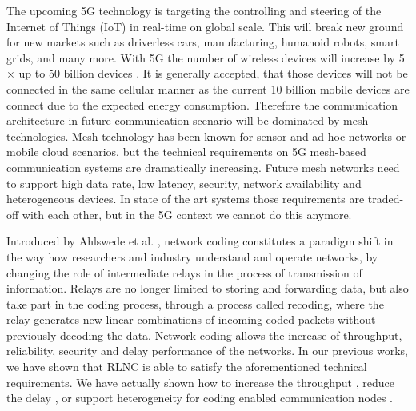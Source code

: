 %

The upcoming 5G technology is targeting the controlling and steering of the Internet of Things (IoT) in real-time on global scale. This will break new ground for new markets such as driverless cars, manufacturing, humanoid robots, smart grids, and many more. With 5G the number of wireless devices will increase by 5$\times$ up to 50 billion devices \cite{cisco2011forecast}. It is generally accepted, that those devices will not be connected in the same cellular manner as the current 10 billion mobile devices are connect due to the expected energy consumption. Therefore the communication architecture in future communication scenario will be dominated by mesh technologies. Mesh technology has been known for sensor and ad hoc networks or mobile cloud scenarios, but the technical requirements on 5G mesh-based communication systems are dramatically increasing. Future mesh networks need to support high data rate, low latency, security, network availability and heterogeneous devices. In state of the art systems those requirements are traded-off with each other, but in the 5G context we cannot do this anymore.

Introduced by Ahlswede et al. \cite{ahlswede2000network}, network coding constitutes a paradigm shift in the way how researchers and industry understand and operate networks, by changing the role of intermediate relays in the process of transmission of information. Relays are no longer limited to storing and forwarding data, but also take part in the coding process, through a process called recoding, where the relay generates new linear combinations of incoming coded packets without previously decoding the data. Network coding allows the increase of throughput, reliability, security and delay performance of the networks. In our previous works, we have shown that \ac{RLNC} \cite{koetter2003algebraic,ho2006random} is able to satisfy the aforementioned technical requirements. We have actually shown how to increase the throughput \cite{pahlevani2013playncool}, reduce the delay \cite{szabo2015towards}, or support heterogeneity for coding enabled communication nodes \cite{lucani2014fulcrum}.

